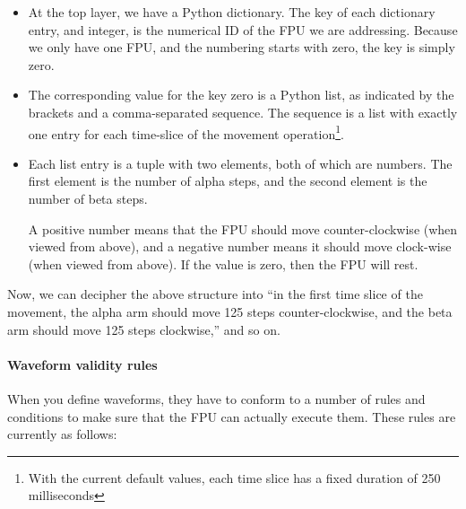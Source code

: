 \documentclass{scrartcl}[12pt,a4paper]
\begin{document}
\begin{itemize}
  
\item At the top layer, we have a Python dictionary.  The key of each
  dictionary entry, and integer, is the numerical ID of the FPU we are
  addressing.  Because we only have one FPU, and the numbering starts
  with zero, the key is simply zero.

\item The corresponding value for the key zero is a Python list, as
  indicated by the brackets and a comma-separated sequence. The
  sequence is a list with exactly one entry for each time-slice of the
  movement operation\footnote{With the current default values,
  each time slice has a fixed duration of 250 milliseconds}.

\item Each list entry is a tuple with two elements, both of which are
  numbers. The first element is the number of alpha steps, and the
  second element is the number of beta steps.

  A positive number means that the FPU should move counter-clockwise
  (when viewed from above), and a negative number means it should move
  clock-wise (when viewed from above). If the value is zero, then the
  FPU will rest.

\end{itemize}

Now, we can decipher the above structure into ``in the first time
slice of the movement, the alpha arm should move 125 steps
counter-clockwise, and the beta arm should move 125 steps
clockwise,'' and so on.

\paragraph{Waveform validity rules}

When you define waveforms, they have to conform to a number of rules
and conditions to make sure that the FPU can actually execute
them. These rules are currently as follows:
\end{document}
